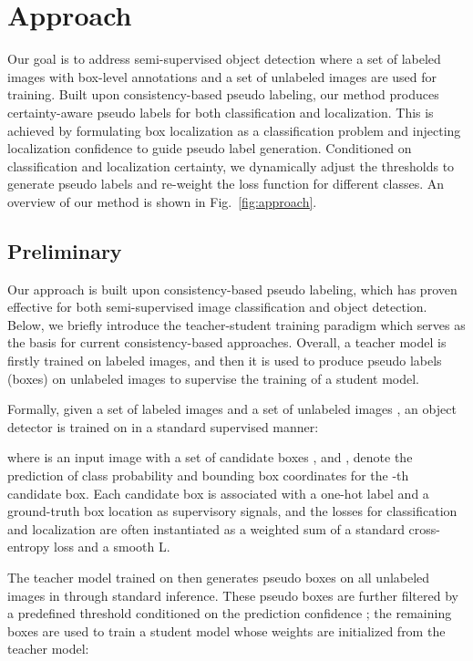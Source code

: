 \documentclass[letterpaper]{article} \usepackage{aaai22}  \usepackage{times}  \usepackage{helvet}  \usepackage{courier}  \usepackage[hyphens]{url}  \usepackage{graphicx} \urlstyle{rm} \def\UrlFont{\rm}  \usepackage{natbib}  \usepackage{caption} \DeclareCaptionStyle{ruled}{labelfont=normalfont,labelsep=colon,strut=off} \frenchspacing  \setlength{\pdfpagewidth}{8.5in}  \setlength{\pdfpageheight}{11in}  \usepackage{algorithm}
\begin{document}
\section{Approach}
\label{sec:approach}

Our goal is to address semi-supervised object detection where a set of labeled images with box-level annotations and a set of unlabeled images are used for training. Built upon  consistency-based pseudo labeling, our method produces certainty-aware pseudo labels for both classification and localization. This is achieved by formulating box localization as a classification problem and injecting localization confidence to guide pseudo label generation. Conditioned on classification and localization certainty, we dynamically adjust the thresholds to generate pseudo labels and re-weight the loss function  for different classes. An overview of our method is shown in Fig.~\ref{fig:approach}.


\subsection{Preliminary} \label{sec:approach_prelim}
Our approach is built upon consistency-based pseudo labeling, which has proven effective for both semi-supervised image classification and object detection. Below, we briefly introduce the teacher-student training paradigm which serves as the basis for current consistency-based approaches. Overall, a teacher model is firstly trained on labeled images, and then it is used to produce pseudo labels (boxes) on unlabeled images to supervise the training of a student model.


Formally, given a set of labeled images  and  a set of unlabeled images , an object detector is trained on  in a standard supervised manner:
 

where  is an input image with a set of candidate boxes , and ,  denote the prediction of class probability and bounding box coordinates for the -th candidate box. Each candidate box is associated with a one-hot label  and a ground-truth box location  as supervisory signals, and the losses for classification and localization are often instantiated as a weighted sum of a standard cross-entropy loss and a smooth L.

The teacher model trained on  then generates pseudo boxes on all unlabeled images in  through standard inference. These pseudo boxes are further filtered by a predefined threshold  conditioned on the prediction confidence ; the remaining boxes are used to train a student model whose weights are initialized from the teacher model: 
 
\end{document}

